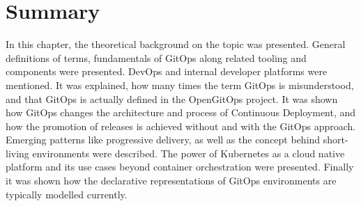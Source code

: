 \section{Summary}

In this chapter,
the theoretical background on the topic was presented.
General definitions of terms,
fundamentals of GitOps along related tooling and components were presented.
DevOps and internal developer platforms were mentioned.
It was explained, how many times the term GitOps is misunderstood,
and that GitOps is actually defined in the OpenGitOps project.
It was shown how GitOps changes the architecture and process of Continuous Deployment,
and how the promotion of releases is achieved without and with the GitOps approach.
Emerging patterns like progressive delivery,
as well as the concept behind short-living environments were described.
The power of Kubernetes as a cloud native platform and its use cases beyond container orchestration were presented.
Finally it was shown how the declarative representations of GitOps environments are typically modelled currently.
































